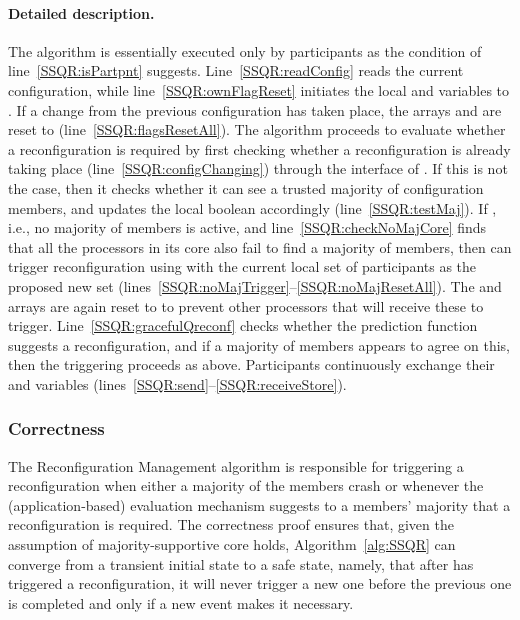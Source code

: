 \documentclass[11pt]{article}
\begin{document}
\paragraph{Detailed description.}
The algorithm is essentially executed only by participants as the condition of line~\ref{SSQR:isPartpnt} suggests.
Line~\ref{SSQR:readConfig} reads the current configuration, while line~\ref{SSQR:ownFlagReset} initiates the local  and  variables to . 
If a change from the previous configuration has taken place, the arrays  and  are reset to  (line~\ref{SSQR:flagsResetAll}).
The algorithm proceeds to evaluate whether a reconfiguration is required by first checking whether a reconfiguration is already taking place (line~\ref{SSQR:configChanging}) through the  interface of .
If this is not the case, then it checks whether it can see a trusted majority of configuration members, and updates the local  boolean accordingly (line~\ref{SSQR:testMaj}).
If , i.e., no majority of members is active, and line~\ref{SSQR:checkNoMajCore} finds that all the processors in its core also fail to find a majority of members, then  can trigger reconfiguration using  with the current local set of participants as the proposed new  set (lines~\ref{SSQR:noMajTrigger}--\ref{SSQR:noMajResetAll}).
The  and  arrays are again reset to  to prevent other processors that will receive these to trigger.
Line~\ref{SSQR:gracefulQreconf} checks whether the prediction function  suggests a reconfiguration, and if a majority of members appears to agree on this, then the triggering proceeds as above.
Participants continuously exchange their  and  variables (lines~\ref{SSQR:send}--\ref{SSQR:receiveStore}). 










\subsubsection{Correctness}
The Reconfiguration Management algorithm is responsible for triggering a reconfiguration when either a majority of the members crash or whenever the (application-based)  evaluation mechanism  suggests to a members' majority that a reconfiguration is required. 
The correctness proof ensures that, given the assumption of majority-supportive core holds, Algorithm~\ref{alg:SSQR} can converge from a transient initial state to a safe state, namely, that after  has triggered a reconfiguration, it will never trigger a new one before the previous one is completed and only if a new event makes it necessary.
\end{document}
